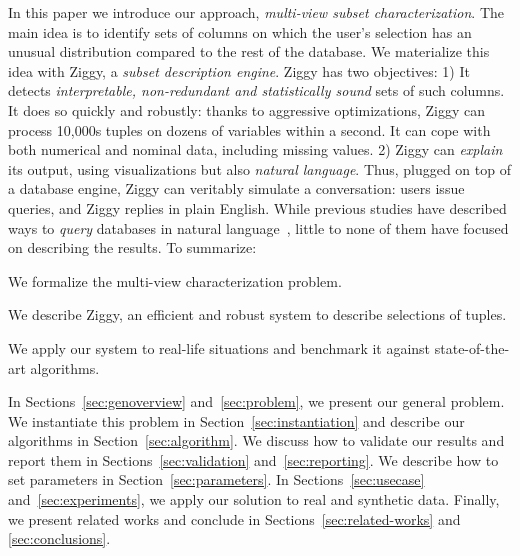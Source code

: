 In this paper we introduce our approach, \emph{multi-view subset
characterization}. The main idea is to identify sets of columns on which the
user's selection has an unusual distribution compared to the rest of the
database.  We materialize this idea with Ziggy, a \emph{subset description
engine}. Ziggy has two objectives: 1) It detects \emph{interpretable,
non-redundant and statistically sound} sets of such columns. It does so quickly
and robustly: thanks to aggressive optimizations, Ziggy can process 10,000s
tuples on dozens of variables within a second. It can cope with both numerical
and nominal data, including missing values. 2) Ziggy can \emph{explain} its
output, using visualizations but also \emph{natural language}.  Thus, plugged
on top of a database engine, Ziggy can veritably simulate a conversation: users
issue queries, and Ziggy replies in plain English. While previous studies have
described ways to \emph{query} databases in natural
language~\cite{li2014constructing}, little to none of them have focused on
describing the results. To summarize:
\begin{itemize0}
    \item We formalize the multi-view characterization problem.
    \item We describe Ziggy, an efficient and robust system to describe
        selections of tuples. 
    \item We apply our system to real-life situations and benchmark it against
        state-of-the-art algorithms.
\end{itemize0}

In Sections~\ref{sec:genoverview}
and~\ref{sec:problem}, we present our general problem. We instantiate this
problem in Section~\ref{sec:instantiation} and describe our algorithms in
Section~\ref{sec:algorithm}. We discuss how to validate our results and report
them in Sections~\ref{sec:validation} and~\ref{sec:reporting}. We describe how
to set parameters in Section~\ref{sec:parameters}. In
Sections~\ref{sec:usecase} and~\ref{sec:experiments}, we apply our solution to
real and synthetic data. Finally, we present related works and conclude in
Sections~\ref{sec:related-works} and \ref{sec:conclusions}.

